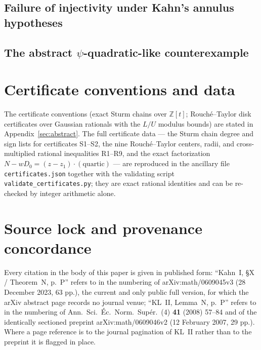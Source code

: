 \documentclass[11pt,reqno]{amsart}
\theoremstyle{definition}
\theoremstyle{remark}
\begin{document}

\subsection{Failure of injectivity under Kahn's annulus hypotheses}

\subsection{The abstract $\psi$-quadratic-like counterexample}

\section{Certificate conventions and data}
\label{app:certificates}
The certificate conventions (exact Sturm chains over $\mathbb Z[t]$;
Rouch\'e--Taylor disk certificates over Gaussian rationals with the
$L/U$ modulus bounds) are stated in Appendix~\ref{sec:abstract}.  The
full certificate data --- the Sturm chain degree and sign lists for
certificates S1--S2, the nine Rouch\'e--Taylor centers, radii, and
cross-multiplied rational inequalities R1--R9, and the exact
factorization $N-wD_{0}=(z-z_{1})\cdot(\text{quartic})$ --- are
reproduced in the ancillary file \texttt{certificates.json} together
with the validating script \texttt{validate\_certificates.py}; they
are exact rational identities and can be re-checked by
integer arithmetic alone.

\section{Source lock and provenance concordance}
\label{app:sourcelock}
Every citation in the body of this paper is given in published form:
``Kahn~I, \S X / Theorem~N, p.~P'' refers to \cite{KahnPrimitive06} in
the numbering of arXiv:math/0609045v3 (28 December 2023, 63 pp.), the
current and only public full version, for which the arXiv abstract page
records no journal venue; ``KL~II, Lemma~N, p.~P'' refers to
\cite{KLDecorations08} in the numbering of
Ann.\ Sci.\ \'Ec.\ Norm.\ Sup\'er.\ (4) \textbf{41} (2008) 57--84 and
of the identically sectioned preprint arXiv:math/0609046v2
(12 February 2007, 29 pp.).  Where a page reference is to the journal
pagination of KL~II rather than to the preprint it is flagged in place.
\end{document}
